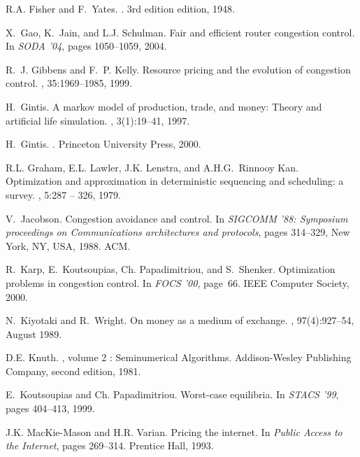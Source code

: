\documentclass[letterpaper,10pt]{llncs}
\begin{document}
\begin{thebibliography}{1}
R.A. Fisher and F.~Yates.
.
\newblock 3rd edition edition, 1948.

X.~Gao, K.~Jain, and L.J. Schulman.
\newblock Fair and efficient router congestion control.
\newblock In {\em SODA '04}, pages 1050--1059, 2004.

R.~J. Gibbens and F.~P. Kelly.
\newblock Resource pricing and the evolution of congestion control.
, 35:1969--1985, 1999.

H.~Gintis.
\newblock A markov model of production, trade, and money: Theory and artificial
  life simulation.
, 3(1):19--41, 1997.

H.~Gintis.
.
\newblock Princeton University Press, 2000.

R.L. Graham, E.L. Lawler, J.K. Lenstra, and A.H.G.~Rinnooy Kan.
\newblock Optimization and approximation in deterministic sequencing and
  scheduling: a survey.
, 5:287 -- 326, 1979.

V.~Jacobson.
\newblock Congestion avoidance and control.
\newblock In {\em SIGCOMM '88: Symposium proceedings on Communications
  architectures and protocols}, pages 314--329, New York, NY, USA, 1988. ACM.

R.~Karp, E.~Koutsoupias, Ch. Papadimitriou, and S.~Shenker.
\newblock Optimization problems in congestion control.
\newblock In {\em FOCS '00}, page~66. IEEE Computer Society, 2000.

N.~Kiyotaki and R.~Wright.
\newblock On money as a medium of exchange.
, 97(4):927--54, August 1989.

D.E. Knuth.
, volume 2 : Seminumerical
  Algorithms.
\newblock Addison-Wesley Publishing Company, second edition, 1981.

E.~Koutsoupias and Ch. Papadimitriou.
\newblock Worst-case equilibria.
\newblock In {\em STACS '99}, pages 404--413, 1999.

J.K. MacKie-Mason and H.R. Varian.
\newblock Pricing the internet.
\newblock In {\em Public Access to the Internet}, pages 269--314. Prentice
  Hall, 1993.


\end{thebibliography}
\end{document}
